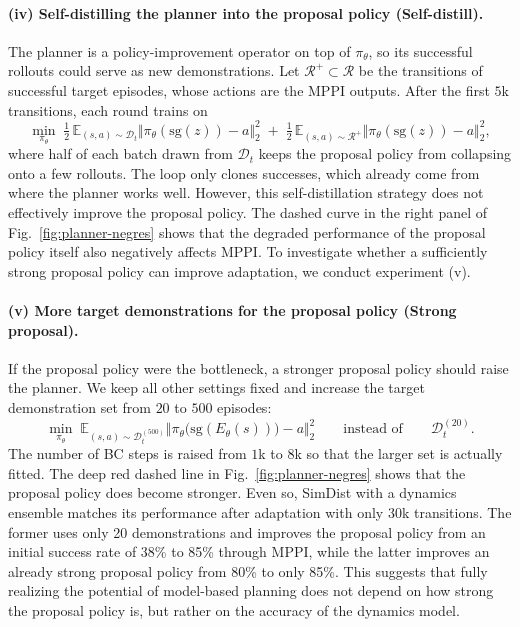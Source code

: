 \documentclass{article} %
\begin{document}
\paragraph{(iv) Self-distilling the planner into the proposal policy (Self-distill).}
The planner is a policy-improvement operator on top of $\pi_\theta$, so its successful rollouts could serve as new demonstrations. Let $\mathcal{R}^{+}\subset\mathcal{R}$ be the transitions of successful target episodes, whose actions are the MPPI outputs. After the first $5$k transitions, each round trains on
\begin{equation}
\min_{\pi_\theta}\;
\tfrac12\,\mathbb{E}_{(s,a)\sim\mathcal{D}_t}\big\Vert \pi_\theta(\mathrm{sg}(z)) - a\big\Vert_2^2
\;+\; \tfrac12\,\mathbb{E}_{(s,a)\sim\mathcal{R}^{+}}\big\Vert \pi_\theta(\mathrm{sg}(z)) - a\big\Vert_2^2 ,
\end{equation}
where half of each batch drawn from $\mathcal{D}_t$ keeps the proposal policy from collapsing onto a few rollouts. The loop only clones successes, which already come from where the planner works well. However, this self-distillation strategy does not effectively improve the proposal policy. The dashed curve in the right panel of Fig.~\ref{fig:planner-negres} shows that the degraded performance of the proposal policy itself also negatively affects MPPI. To investigate whether a sufficiently strong proposal policy can improve adaptation, we conduct experiment (v).


\paragraph{(v) More target demonstrations for the proposal policy (Strong proposal).}
If the proposal policy were the bottleneck, a stronger proposal policy should raise the planner. We keep all other settings fixed and increase the target demonstration set from $20$ to $500$ episodes:
\begin{equation}
\min_{\pi_\theta}\;
\mathbb{E}_{(s,a)\sim\mathcal{D}_t^{(500)}}
\big\Vert \pi_\theta\big(\mathrm{sg}(E_\theta(s))\big) - a \big\Vert_2^2
\qquad\text{instead of}\qquad \mathcal{D}_t^{(20)}.
\end{equation}
The number of BC steps is raised from $1$k to $8$k so that the larger set is actually fitted. The deep red dashed line in Fig.~\ref{fig:planner-negres} shows that the proposal policy does become stronger. Even so, SimDist with a dynamics ensemble matches its performance after adaptation with only 30k transitions. The former uses only 20 demonstrations and improves the proposal policy from an initial success rate of 38\% to 85\% through MPPI, while the latter improves an already strong proposal policy from 80\% to only 85\%. This suggests that fully realizing the potential of model-based planning does not depend on how strong the proposal policy is, but rather on the accuracy of the dynamics model.
\end{document}
